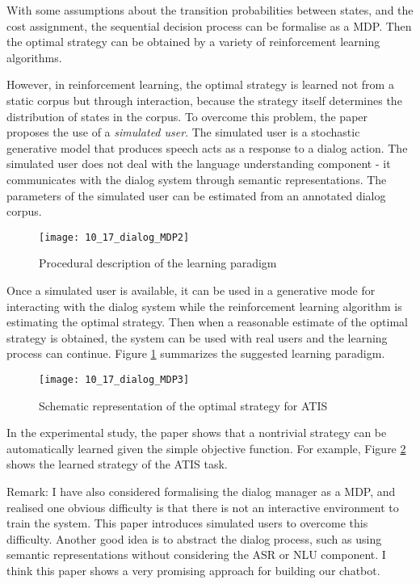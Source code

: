 With some assumptions about the transition probabilities between states, and the cost assignment, the sequential decision process can be formalise as a MDP. Then the optimal strategy can be obtained by a variety of reinforcement learning algorithms.

However, in reinforcement learning, the optimal strategy is learned not from a static corpus but through interaction, because the strategy itself determines the distribution of states in the corpus. To overcome this problem, the paper proposes the use of a \emph{simulated user}. The simulated user is a stochastic generative model that produces speech acts as a response to a dialog action. The simulated user does not deal with the language understanding component - it communicates with the dialog system through semantic representations. The parameters of the simulated user can be estimated from an annotated dialog corpus.

\begin{figure}[htbp]
  \centering
  \texttt{[image: 10\_17\_dialog\_MDP2]}\\
  \caption{Procedural description of the learning paradigm}\label{fig:dialog_MDP2}
\end{figure}

Once a simulated user is available, it can be used in a generative mode for interacting with the dialog system while the reinforcement learning algorithm is estimating the optimal strategy. Then when a reasonable estimate of the optimal strategy is obtained, the system can be used with real users and the learning process can continue. Figure \ref{fig:dialog_MDP2} summarizes the suggested learning paradigm.

\begin{figure}[htbp]
  \centering
  \texttt{[image: 10\_17\_dialog\_MDP3]}\\
  \caption{Schematic representation of the optimal strategy for ATIS}\label{fig:dialog_MDP3}
\end{figure}

In the experimental study, the paper shows that a nontrivial strategy can be automatically learned given the simple objective function. For example, Figure \ref{fig:dialog_MDP3} shows the learned strategy of the ATIS task.

Remark: I have also considered formalising the dialog manager as a MDP, and realised one obvious difficulty is that there is not an interactive environment to train the system. This paper introduces simulated users to overcome this difficulty. Another good idea is to abstract the dialog process, such as using semantic representations without considering the ASR or NLU component. I think this paper shows a very promising approach for building our chatbot. 